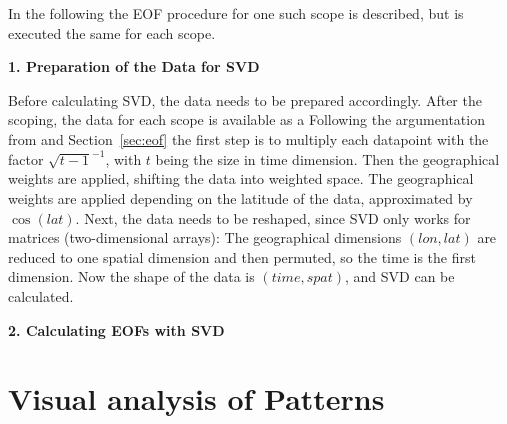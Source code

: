 In the following the EOF procedure for one such scope is described, but is executed the same for each scope. 

\textbf{1. Preparation of the Data for SVD}

Before calculating SVD, the data needs to be prepared accordingly. 
After the scoping, the data for each scope is available as a 
Following the argumentation from \cite{vietinghoffdiss} and Section~\ref{sec:eof} the first step is to multiply each datapoint with the factor $\sqrt{t-1}^{-1}$, with $t$ being the size in time dimension. 
Then the geographical weights are applied, shifting the data into weighted space. 
The geographical weights are applied depending on the latitude of the data, approximated by $\cos(lat)$. 
Next, the data needs to be reshaped, since SVD only works for matrices (two-dimensional arrays): The geographical dimensions $(lon, lat)$ are reduced to one spatial dimension and then permuted, so the time is the first dimension. 
Now the shape of the data is $(time, spat)$, and SVD can be calculated. 

\textbf{2. Calculating EOFs with SVD}




\section{Visual analysis of Patterns}
\label{sec:vis_analysis}
